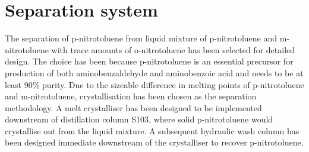 \section*{Separation system}

The separation of p-nitrotoluene from liquid mixture of p-nitrotoluene and m-nitrotoluene with trace amounts of o-nitrotoluene has been selected for detailed design. The choice has been because p-nitrotoluene is an essential precursor for production of both aminobenzaldehyde and aminobenzoic acid and needs to be at least 90\% purity. Due to the sizeable difference in melting points of p-nitrotoluene and m-nitrotoluene, crystallisation has been chosen as the separation methodology. A melt crystalliser has been designed to be implemented downstream of distillation column S103, where solid p-nitrotoluene would crystallise out from the liquid mixture. A subsequent hydraulic wash column has been designed immediate downstream of the crystalliser to recover p-nitrotoluene. 

